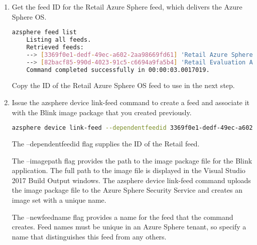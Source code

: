 \begin{enumerate}
    \item Get the feed ID for the Retail Azure Sphere feed, which delivers the Azure Sphere OS.
    \begin{lstlisting}[language=bash]
    azsphere feed list
    Listing all feeds.
    Retrieved feeds:
    --> [3369f0e1-dedf-49ec-a602-2aa98669fd61] 'Retail Azure Sphere OS'
    --> [82bacf85-990d-4023-91c5-c6694a9fa5b4] 'Retail Evaluation Azure Sphere OS'
    Command completed successfully in 00:00:03.0017019.
    \end{lstlisting}
    Copy the ID of the Retail Azure Sphere OS feed to use in the next step.
    
    \item Issue the azsphere device link-feed command to create a feed and associate it with the Blink image package that you created previously.
    \begin{lstlisting}[language=bash]
    azsphere device link-feed --dependentfeedid 3369f0e1-dedf-49ec-a602-2aa98669fd61 --imagepath "C:\Users\A548068\Documents\AZure\Blink\Mt3620Blink1\Mt3620Blink1\bin\ARM\Debug\Mt3620Blink1.imagepackage" --newfeedname "Mt3620Blink1"
    \end{lstlisting}
    The --dependentfeedid flag supplies the ID of the Retail feed.
    
    The --imagepath flag provides the path to the image package file for the Blink application. The full path to the image file is displayed in the Visual Studio 2017 Build Output windows. The azsphere device link-feed command uploads the image package file to the Azure Sphere Security Service and creates an image set with a unique name.
    
    The --newfeedname flag provides a name for the feed that the command creates. Feed names must be unique in an Azure Sphere tenant, so specify a name that distinguishes this feed from any others.
    

\end{enumerate}
